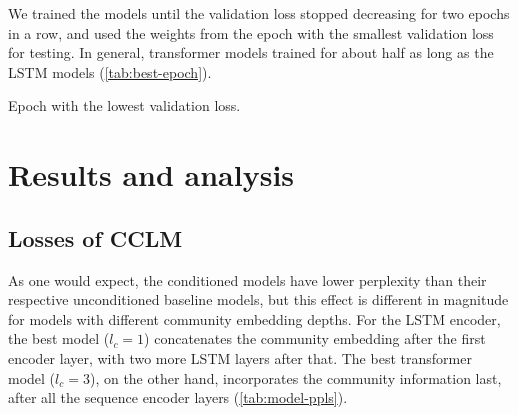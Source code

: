 \documentclass[11pt,a4paper]{article}
\begin{document}
We trained the models until the validation loss stopped decreasing 
for two epochs in a row,
and used the weights from the epoch with the smallest validation loss for testing.
In general, transformer models trained for about half as long as the LSTM models (\cref{tab:best-epoch}).

\begin{table}
  \centering
  
  \caption{Epoch with the lowest validation loss.}
  \label{tab:best-epoch}
\end{table}



\section{Results and analysis}

\subsection{Losses of CCLM}

As one would expect, 
the conditioned models have lower perplexity
than their respective unconditioned baseline models,
but this effect is different in magnitude
for models with different community embedding depths.
For the LSTM encoder, 
the best model ($l_c=1$) concatenates the community embedding after the first encoder layer,
with two more LSTM layers after that.
The best transformer model ($l_c=3$), on the other hand,
incorporates the community information last,
after all the sequence encoder layers
(\cref{tab:model-ppls}).

\end{document}
